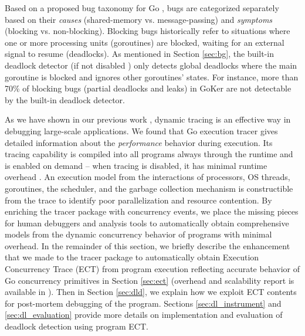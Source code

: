 Based on a proposed bug taxonomy for Go \cite{tu-concurrentBugs-asplos19}, bugs are categorized separately based on their \textit{causes} (shared-memory vs. message-passing) and \textit{symptoms} (blocking vs. non-blocking).
%
Blocking bugs historically refer to situations where one or more processing units (\eg goroutines) are blocked, waiting for an external signal to resume (\ie deadlocks).
%
As mentioned in Section \ref{sec:bg}, the built-in deadlock detector (if not disabled \cite{go-netDeadlock}) only detects global deadlocks where the main goroutine is blocked and ignores other goroutines' states. For instance, more than 70\% of blocking bugs (partial deadlocks and leaks) in GoKer \cite{GoKer} are not detectable by the built-in deadlock detector.
%

As we have shown in our previous work \cite{parlot,difftrace}, dynamic tracing is an effective way in debugging large-scale applications.
%
We found that Go execution tracer \cite{go-cmd-trace} gives detailed information about the \textit{performance} behavior during execution.
%
Its tracing capability is compiled into all programs always through the runtime and is enabled on demand -- when tracing is disabled, it has minimal runtime overhead \cite{go-exec-tracer-doc}.
%
An execution model from the interactions of processors, OS threads, goroutines, the scheduler, and the garbage collection mechanism is constructible from the trace to identify poor parallelization and resource contention.
%
By enriching the tracer package with concurrency events, we place the missing pieces for human debuggers and analysis tools to automatically obtain comprehensive models from the dynamic concurrency behavior of programs with minimal overhead.
%
In the remainder of this section, we briefly describe the enhancement that we made to the tracer package to automatically obtain Execution Concurrency Trace (ECT) from program execution reflecting accurate behavior of Go concurrency primitives in Section \ref{sec:ect} (overhead and scalability report is available in \cite{ect-arxiv}).
%
Then in Section \ref{sec:dld}, we explain how we exploit ECT contents for post-mortem debugging of the program.
%
Sections \ref{sec:dl_instrument} and \ref{sec:dl_evaluation} provide more details on implementation and evaluation of deadlock detection using program ECT.



%


